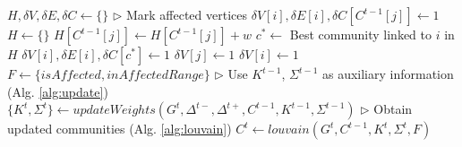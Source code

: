 \begin{algorithm}[hbtp]
\begin{algorithmic}[1]
  \State $H, \delta V, \delta E, \delta C \gets \{\}$ \label{alg:delta--init}
  \State $\rhd$ Mark affected vertices
   \label{alg:delta--loopdel-begin}
      \State $\delta V[i], \delta E[i], \delta C[C^{t-1}[j]] \gets 1$ \label{alg:delta--loopdelmark}
    \EndIf
  \EndFor \label{alg:delta--loopdel-end}
   \label{alg:delta--loopins-begin}
    \State $H \gets \{\}$
     \label{alg:delta--loopinssrc-begin}
        \State $H[C^{t-1}[j]] \gets H[C^{t-1}[j]] + w$
      \EndIf
    \EndFor \label{alg:delta--loopinssrc-end}
    \State $c^* \gets$ Best community linked to $i$ in $H$ \label{alg:delta--loopinschoose}
    \State $\delta V[i], \delta E[i], \delta C[c^*] \gets 1$ \label{alg:delta--loopinsmark}
  \EndFor \label{alg:delta--loopins-end}
   \label{alg:delta--loopaff-begin}
     \label{alg:delta--loopaffnei-begin}
        \State $\delta V[j] \gets 1$
      \EndFor
    \EndIf \label{alg:delta--loopaffnei-end}
     \label{alg:delta--loopaffcom-begin}
      \State $\delta V[i] \gets 1$
    \EndIf \label{alg:delta--loopaffcom-end}
  \EndFor \label{alg:delta--loopaff-end}
   \label{alg:delta--isaff-begin}
  \EndFunction \label{alg:delta--isaff-end}
   \label{alg:delta--isaffrng-begin}
  \EndFunction \label{alg:delta--isaffrng-end}
  \State $F \gets \{isAffected, inAffectedRange\}$ \label{alg:delta--lambdas}
  \State $\rhd$ Use $K^{t-1}$, $\Sigma^{t-1}$ as auxiliary information (Alg. \ref{alg:update})
  \State $\{K^t, \Sigma^t\} \gets updateWeights(G^t, \Delta^{t-}, \Delta^{t+}, C^{t-1}, K^{t-1}, \Sigma^{t-1})$\label{alg:delta--auxiliary}
  \State $\rhd$ Obtain updated communities (Alg. \ref{alg:louvain})
  \State $C^t \gets louvain(G^t, C^{t-1}, K^t, \Sigma^t, F)$ \label{alg:delta--louvain}
   \label{alg:delta--return}
\EndFunction
\end{algorithmic}
\end{algorithm}
